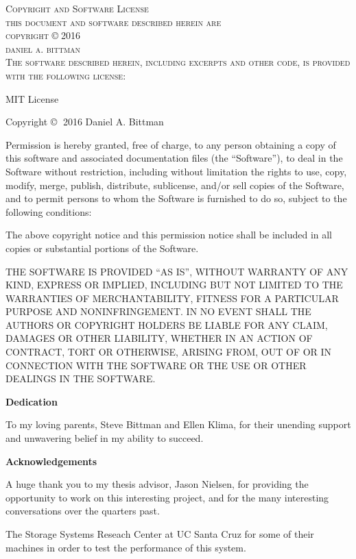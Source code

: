 \documentclass[12pt]{article}
\begin{document}
\begin{center}
	\textsc{{\Large Copyright and Software License}}\\
	\vspace{1in}
	\textsc{this document and software described herein are\\\vspace{5mm}copyright} \copyright $\;$\textsc{2016\\daniel a. bittman}\\
	\vspace{1in}
	\textsc{The software described herein, including excerpts and other code, is provided with the following license:}

	MIT License

Copyright \copyright $\;$ 2016 Daniel A. Bittman

Permission is hereby granted, free of charge, to any person obtaining a copy
of this software and associated documentation files (the ``Software''), to deal
in the Software without restriction, including without limitation the rights
to use, copy, modify, merge, publish, distribute, sublicense, and/or sell
copies of the Software, and to permit persons to whom the Software is
furnished to do so, subject to the following conditions:

The above copyright notice and this permission notice shall be included in all
copies or substantial portions of the Software.

THE SOFTWARE IS PROVIDED ``AS IS'', WITHOUT WARRANTY OF ANY KIND, EXPRESS OR
IMPLIED, INCLUDING BUT NOT LIMITED TO THE WARRANTIES OF MERCHANTABILITY,
FITNESS FOR A PARTICULAR PURPOSE AND NONINFRINGEMENT. IN NO EVENT SHALL THE
AUTHORS OR COPYRIGHT HOLDERS BE LIABLE FOR ANY CLAIM, DAMAGES OR OTHER
LIABILITY, WHETHER IN AN ACTION OF CONTRACT, TORT OR OTHERWISE, ARISING FROM,
OUT OF OR IN CONNECTION WITH THE SOFTWARE OR THE USE OR OTHER DEALINGS IN THE
SOFTWARE.

\end{center}
\clearpage

\begin{center}

	\textbf{Dedication}
	\vspace{50mm}

	To my loving parents, Steve Bittman and Ellen Klima, for their unending support
	and unwavering belief in my ability to succeed.
\end{center}
\clearpage
\begin{center}
	\textbf{Acknowledgements}
	\vspace{50mm}

	A huge thank you to my thesis advisor, Jason Nielsen, for providing the opportunity
	to work on this interesting project, and for the many interesting conversations over
	the quarters past.

	\vspace{10mm}
	The Storage Systems Reseach Center at UC Santa Cruz for some of their machines in order
	to test the performance of this system.
\end{center}
\clearpage
\tableofcontents
\clearpage
\listoffigures
\listoftables
\clearpage
\renewcommand{\lstlistlistingname}{List of Source Code Listings}
\lstlistoflistings
\clearpage
\end{document}
